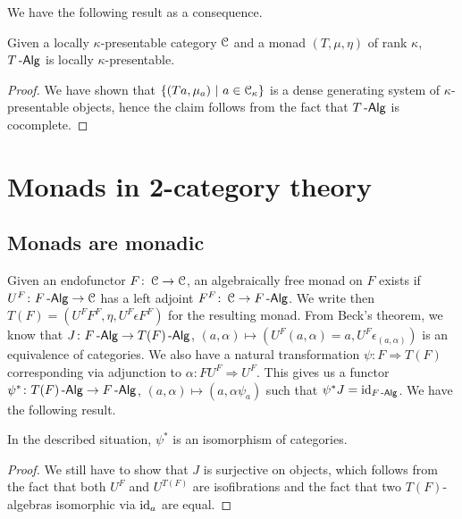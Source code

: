 \documentclass[a4paper,11pt,oneside,openany]{scrbook}
\begin{document}
We have the following result as a consequence.

\begin{thm}
	Given a locally $\kappa$-presentable category $\operatorname{\mathcal{C}}$ and a monad $(T,\mu,\eta)$ of rank $\kappa$, $T\operatorname{-\mathsf{Alg}}$ is locally $\kappa$-presentable.
\end{thm}

\begin{proof}
	We have shown that $\{(Ta,\mu_a)\ |\ a\in\operatorname{\mathcal{C}}_\kappa\}$ is a dense generating system of $\kappa$-presentable objects, hence the claim follows from the fact that $T\operatorname{-\mathsf{Alg}}$ is cocomplete.
\end{proof}

\chapter{Monads in 2-category theory}

\section{Monads are monadic}

Given an endofunctor $F\colon\operatorname{\mathcal{C}}\rightarrow\operatorname{\mathcal{C}}$, an algebraically free monad on $F$ exists if $U^F\colon F\operatorname{-\mathsf{Alg}}\rightarrow\operatorname{\mathcal{C}}$ has a left adjoint $F^F\colon\operatorname{\mathcal{C}}\rightarrow F\operatorname{-\mathsf{Alg}}$. We write then $T(F)=(U^FF^F,\eta,U^F\epsilon F^F)$ for the resulting monad. From Beck's theorem, we know that $J\colon F\operatorname{-\mathsf{Alg}}\rightarrow T(F)\operatorname{-\mathsf{Alg}}$, $(a,\alpha)\mapsto (U^F(a,\alpha)=a,U^F\epsilon_{(a,\alpha)})$ is an equivalence of categories. We also have a natural transformation $\psi\colon F\Rightarrow T(F)$ corresponding via adjunction to $\alpha\colon FU^F\Rightarrow U^F$. This gives us a functor $\psi^*\colon T(F)\operatorname{-\mathsf{Alg}}\rightarrow F\operatorname{-\mathsf{Alg}}$, $(a,\alpha)\mapsto (a,\alpha\psi_a)$ such that $\psi^* J=\operatorname{id}_{F\operatorname{-\mathsf{Alg}}}$. We have the following result.

\begin{prop}
	In the described situation, $\psi^*$ is an isomorphism of categories.
\end{prop}

\begin{proof}
	We still have to show that $J$ is surjective on objects, which follows from the fact that both $U^F$ and $U^{T(F)}$ are isofibrations and the fact that two $T(F)$-algebras isomorphic via $\operatorname{id}_a$ are equal.
\end{proof}
\end{document}
